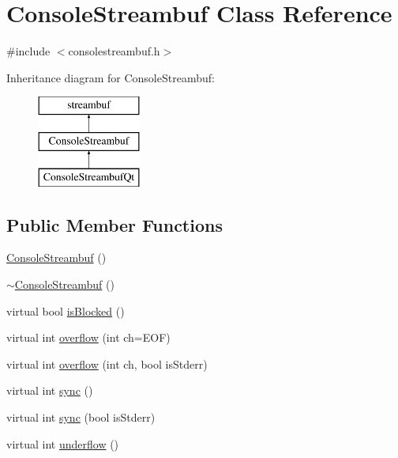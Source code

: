 \hypertarget{classsgl_1_1ConsoleStreambuf}{}\section{Console\+Streambuf Class Reference}
\label{classsgl_1_1ConsoleStreambuf}


{\ttfamily \#include $<$consolestreambuf.\+h$>$}

Inheritance diagram for Console\+Streambuf\+:\begin{figure}[H]
\begin{center}
\leavevmode
\includegraphics[height=3.000000cm]{classsgl_1_1ConsoleStreambuf}
\end{center}
\end{figure}
\subsection*{Public Member Functions}
\begin{DoxyCompactItemize}
\item 
\mbox{\hyperlink{classsgl_1_1ConsoleStreambuf_a00319cc8035be74bbc3bb63d60b8c8da}{Console\+Streambuf}} ()
\item 
\mbox{\hyperlink{classsgl_1_1ConsoleStreambuf_ae72ddab09d66eb582db69ea4132288ab}{$\sim$\+Console\+Streambuf}} ()
\item 
virtual bool \mbox{\hyperlink{classsgl_1_1ConsoleStreambuf_a61d5d93ba4956eefeb2e3d617d34c801}{is\+Blocked}} ()
\item 
virtual int \mbox{\hyperlink{classsgl_1_1ConsoleStreambuf_adccb3cd5475ba3c83bc2b0a8cbd731c0}{overflow}} (int ch=E\+OF)
\item 
virtual int \mbox{\hyperlink{classsgl_1_1ConsoleStreambuf_a5cfed6bdc955e2129ced962625045f8e}{overflow}} (int ch, bool is\+Stderr)
\item 
virtual int \mbox{\hyperlink{classsgl_1_1ConsoleStreambuf_a810a727ce5554d3178e17b6bc55025dd}{sync}} ()
\item 
virtual int \mbox{\hyperlink{classsgl_1_1ConsoleStreambuf_ad5f4344df2a20a0000adb05d4e656855}{sync}} (bool is\+Stderr)
\item 
virtual int \mbox{\hyperlink{classsgl_1_1ConsoleStreambuf_aeb6918bd44153b257e097e2d2ef370ef}{underflow}} ()
\end{DoxyCompactItemize}
